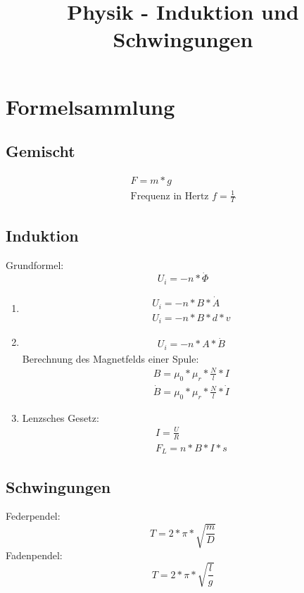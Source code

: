 \documentclass{article}
\title{Physik - Induktion und Schwingungen}
\begin{document}
\maketitle

\section*{Formelsammlung}
\subsection*{Gemischt}
\begin{gather*}
    F = m * g\\
    \text{Frequenz in Hertz } f= \frac{1}{T}
\end{gather*}
\subsection*{Induktion}
Grundformel:
\begin{equation*}
    U_i = -n * \dot{\Phi}
\end{equation*}

\begin{enumerate}
    \item \begin{gather*}
              U_i = -n * B * \dot{A}\\
              U_i = -n * B * d * v
          \end{gather*}
    \item \begin{gather*}
              U_i = -n * A * \dot{B}
          \end{gather*}
          Berechnung des Magnetfelds einer Spule:
          \begin{gather*}
              B = \mu_0 * \mu_r * \frac{N}{l} * I\\
              \dot{B} = \mu_0 * \mu_r * \frac{N}{l} * \dot{I}
          \end{gather*}

    \item Lenzsches Gesetz:
          \begin{gather*}
              I = \frac{U}{R}\\
              F_L = n * B * I * s
          \end{gather*}
\end{enumerate}

\subsection*{Schwingungen}
Federpendel:
\begin{equation*}
    T = 2 * \pi * \sqrt{\frac{m}{D}}
\end{equation*}
Fadenpendel:
\begin{equation*}
    T = 2 * \pi * \sqrt{\frac{l}{g}}
\end{equation*}
\end{document}
